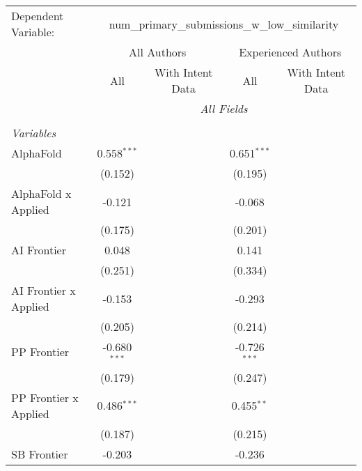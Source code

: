 \begingroup
\centering
\begin{tabular}{lcccccc}
   \tabularnewline \midrule \midrule
   Dependent Variable: & \multicolumn{6}{c}{num\_primary\_submissions\_w\_low\_similarity}\\
 & \multicolumn{3}{c}{All Authors} & \multicolumn{3}{c}{Experienced Authors} \\
\cmidrule(lr){2-4} \cmidrule(lr){5-7}
 & \multicolumn{1}{c}{All} & \multicolumn{2}{c}{With Intent Data} & \multicolumn{1}{c}{All} & \multicolumn{2}{c}{With Intent Data} \\
\cmidrule(lr){2-2} \cmidrule(lr){3-4} \cmidrule(lr){5-5} \cmidrule(lr){6-7}
 & \multicolumn{6}{c}{\textit{All Fields}} \\ \\
   \emph{Variables}\\
   AlphaFold             & 0.558$^{***}$  &         &         & 0.651$^{***}$  &         &   \\   
                         & (0.152)        &         &         & (0.195)        &         &   \\   
   AlphaFold x Applied   & -0.121         &         &         & -0.068         &         &   \\   
                         & (0.175)        &         &         & (0.201)        &         &   \\   
   AI Frontier           & 0.048          &         &         & 0.141          &         &   \\   
                         & (0.251)        &         &         & (0.334)        &         &   \\   
   AI Frontier x Applied & -0.153         &         &         & -0.293         &         &   \\   
                         & (0.205)        &         &         & (0.214)        &         &   \\   
   PP Frontier           & -0.680$^{***}$ &         &         & -0.726$^{***}$ &         &   \\   
                         & (0.179)        &         &         & (0.247)        &         &   \\   
   PP Frontier x Applied & 0.486$^{***}$  &         &         & 0.455$^{**}$   &         &   \\   
                         & (0.187)        &         &         & (0.215)        &         &   \\   
   SB Frontier           & -0.203         &         &         & -0.236         &         &   \\   

\end{tabular}
